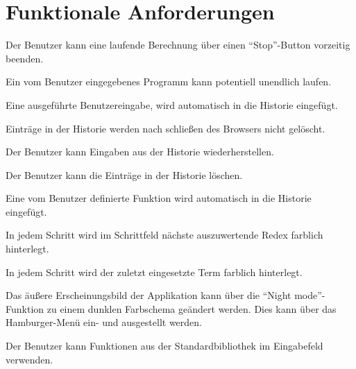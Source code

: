 \documentclass[parskip=full,11pt,twoside]{scrartcl}
\begin{document}
\section{Funktionale Anforderungen}

 
Der Benutzer kann eine laufende Berechnung über einen \enquote{Stop}-Button vorzeitig beenden.

Ein vom Benutzer eingegebenes Programm kann potentiell unendlich laufen.

Eine ausgeführte Benutzereingabe, wird automatisch in die Historie eingefügt.

Einträge in der Historie werden nach schließen des Browsers nicht gelöscht.

Der Benutzer kann Eingaben aus der Historie wiederherstellen.

Der Benutzer kann die Einträge in der Historie löschen.

Eine vom Benutzer definierte Funktion wird automatisch in die Historie eingefügt.

In jedem Schritt wird im Schrittfeld nächste auszuwertende Redex farblich hinterlegt.

In jedem Schritt wird der zuletzt eingesetzte Term farblich hinterlegt.

Das äußere Erscheinungsbild der Applikation kann über die \enquote{Night mode}-Funktion zu einem dunklen Farbschema geändert werden. Dies kann über das Hamburger-Menü ein- und ausgestellt werden.

Der Benutzer kann Funktionen aus der Standardbibliothek im Eingabefeld verwenden.
\end{document}
